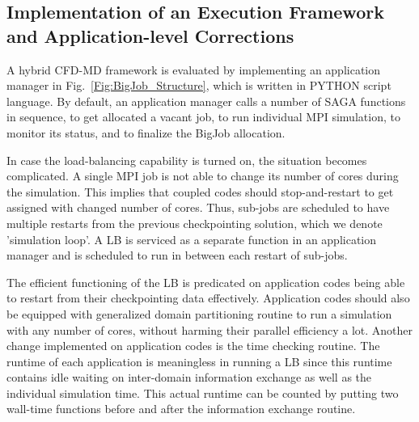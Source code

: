 \documentclass[preprint,12pt]{elsarticle}
\begin{document}



\subsection{Implementation of an Execution Framework and Application-level Corrections}

A hybrid CFD-MD framework is evaluated by implementing an application manager 
in Fig.~\ref{Fig:BigJob_Structure}, which is written in PYTHON script language. 
By default, an application manager calls a number of SAGA functions in sequence, 
to get allocated a vacant job, to run individual MPI simulation, 
to monitor its status, and to finalize the BigJob allocation.

In case the load-balancing capability is turned on, the situation becomes complicated. 
A single MPI job is not able to change its number of cores during the simulation. 
This implies that coupled codes should stop-and-restart to get assigned with 
changed number of cores. Thus, sub-jobs are scheduled to have multiple restarts 
from the previous checkpointing solution, which we denote 'simulation loop'. 
A LB is serviced as a separate function in an application manager and 
is scheduled to run in between each restart of sub-jobs.

The efficient functioning of the LB is predicated on application codes being able to restart from their checkpointing data effectively. Application codes should also be equipped with generalized domain partitioning routine to run a simulation with any number of cores, without harming their parallel efficiency a lot. 
Another change implemented on application codes is the time checking routine. 
The runtime of each application is meaningless in running a LB since 
this runtime contains idle waiting on inter-domain information exchange as well as 
the individual simulation time. This actual runtime can be counted 
by putting two wall-time functions before and after the information exchange routine.
\end{document}
